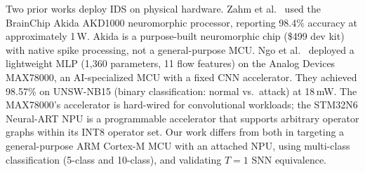 \documentclass[10pt,twocolumn]{article}
\begin{document}
Two prior works deploy IDS on physical hardware.
Zahm et al.~\cite{zahm2024csiac} used the BrainChip Akida AKD1000
neuromorphic processor, reporting 98.4\% accuracy at approximately 1\,W.
Akida is a purpose-built neuromorphic chip (\$499 dev kit) with native
spike processing, not a general-purpose MCU.
Ngo et al.~\cite{ngo2022hhnids} deployed a lightweight MLP (1,360
parameters, 11 flow features) on the Analog Devices MAX78000, an
AI-specialized MCU with a fixed CNN accelerator.
They achieved 98.57\% on UNSW-NB15 (binary classification: normal vs.\
attack) at 18\,mW.
The MAX78000's accelerator is hard-wired for convolutional workloads;
the STM32N6 Neural-ART NPU is a programmable accelerator that supports
arbitrary operator graphs within its INT8 operator set.
Our work differs from both in targeting a general-purpose ARM Cortex-M
MCU with an attached NPU, using multi-class classification
(5-class and 10-class), and validating $T{=}1$ SNN equivalence.
\end{document}
